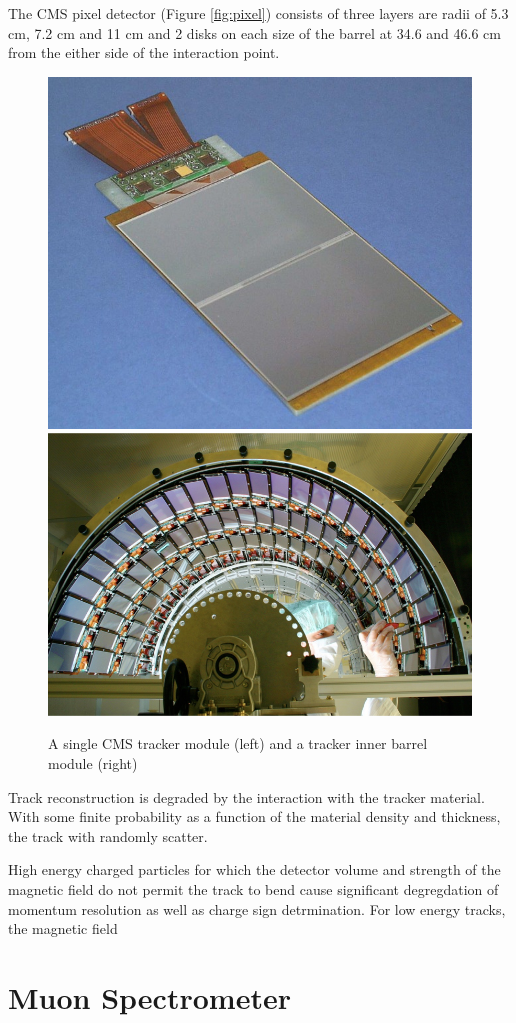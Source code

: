 {The CMS pixel detector (Figure \ref{fig:pixel}) consists of three layers are radii of 5.3 cm, 7.2 cm and 11 cm and 2 disks on each size of the barrel at 34.6 and 46.6 cm from the either side of the interaction point. 

\begin{figure}
\begin{center}
\includegraphics[width=.45\textwidth]{pics/tracker_module}
\includegraphics[width=.45\textwidth]{pics/tracker_strips}
\end{center}
\caption{A single CMS tracker module (left) and a tracker inner barrel module (right)}
\label{fig:tracker_strips_and_module}
\end{figure}

Track reconstruction is degraded by the interaction with the tracker material. With some finite probability
as a function of the material density and thickness, the track with randomly scatter. 

High energy charged particles for which the detector volume and strength of the magnetic field do not permit the track
to bend cause significant degregdation of momentum resolution as well as charge sign detrmination. For low energy tracks, 
the magnetic field 

\section{Muon Spectrometer}

}
